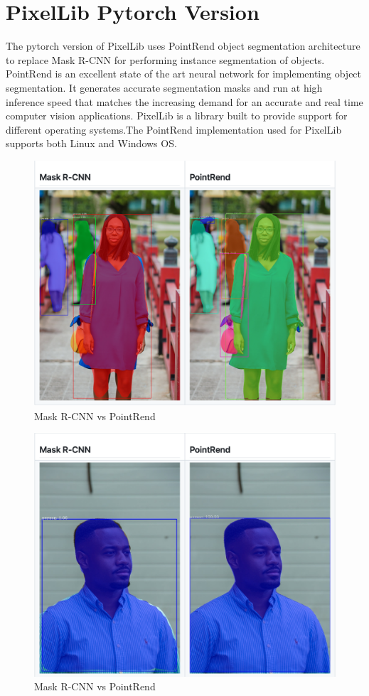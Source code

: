 \section{PixelLib Pytorch Version}

The pytorch version of PixelLib uses PointRend object segmentation architecture to replace Mask R-CNN for performing instance segmentation of objects. PointRend is an excellent state of the art neural network for implementing object segmentation. It generates accurate segmentation masks and run at high inference speed that matches the increasing demand for an accurate and real time computer vision applications. PixelLib is a library built to provide support for different operating systems.The PointRend implementation used for PixelLib supports both Linux and Windows OS.

\begin{figure}[h!]
    \centering
    \includegraphics[width=0.8\linewidth]{Images/PixelLib/pytorch1.png} %
    
    \caption{Mask R-CNN vs PointRend}
    \label{fig:your_image_label}
    
    
\end{figure}

\begin{figure}[h!]
    \centering
    \includegraphics[width=0.8\linewidth]{Images/PixelLib/pytorch2.png} %
    
    \caption{Mask R-CNN vs PointRend}
    \label{fig:your_image_label}
    
    
\end{figure}


